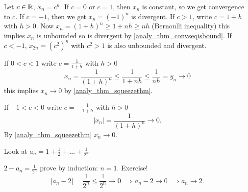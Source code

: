 \documentclass[10pt, a4paper]{article}
\begin{document}
\begin{example}
    Let $c \in \mathbb{R}$, $x_n = c ^ n$.
    If $c = 0$ or $c = 1$,
    then $x_n$ is constant,
    so we get convergence to $c$.
    If $c = -1$,
    then we get $x_n = (-1) ^ n$ is divergent.
    If $c > 1$,
    write $c = 1 + h$ with $h > 0$.
    Now $x_n = (1 + h) ^ n \geq 1 + nh \geq nh$ (Bernoulli inequality)
    this implies $x_n$ is unbounded so is divergent by \autoref{analy_thm_convseqisbound}.
    If $c < -1$,
    $x_{2n} = (c ^ 2) ^ n$ with $c ^ 2 > 1$ is also unbounded and divergent.

    If $0 < c < 1$ write $c = \frac{1}{1 + h}$ with $h > 0$
    \[
    x_n = \frac{1}{(1 + h) ^ n} \leq \frac{1}{1 + nh} \leq \frac{1}{nh} = y_n \rightarrow 0
    \]
    this implies $x_n \rightarrow 0$ by \autoref{analy_thm_squeezethm}.

    If $-1 < c < 0$ write $c = -\frac{1}{1 + h}$ with $h > 0$
    \[
    |x_n| = \frac{1}{(1 + h) ^ n} \rightarrow 0.
    \]
    By \autoref{analy_thm_squeezethm} $x_n \rightarrow 0$.
\end{example}

\begin{example}
    Look at $a_n = 1 + \frac{1}{2} + \dotsc + \frac{1}{2 ^ n}$

    $2 - a_n = \frac{1}{2 ^ n}$ prove by induction: $n = 1$.
    Exercise!
    \[
    |a_n - 2| = \frac{1}{2 ^ n} \leq \frac{1}{2 ^ n} \rightarrow 0 \implies a_n - 2 \rightarrow 0 \implies a_n \rightarrow 2.
    \]
\end{example}
\end{document}
